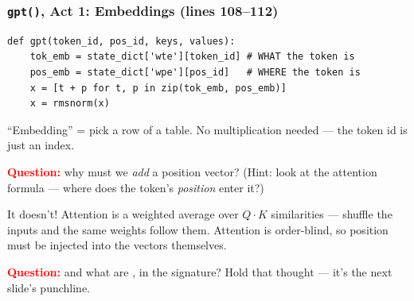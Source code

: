 \begin{frame}[fragile]
    \frametitle{\texttt{gpt()}, Act 1: Embeddings (lines 108--112)}

\begin{lstlisting}
def gpt(token_id, pos_id, keys, values):
    tok_emb = state_dict['wte'][token_id] # WHAT the token is
    pos_emb = state_dict['wpe'][pos_id]   # WHERE the token is
    x = [t + p for t, p in zip(tok_emb, pos_emb)]
    x = rmsnorm(x)
\end{lstlisting}

    ``Embedding'' = \alert{pick a row of a table}. No multiplication needed --- the token id is just an index.

    \pause

    \textcolor{red}{\textbf{Question:}} why must we \emph{add} a position vector? (Hint: look at the attention formula --- where does the token's \emph{position} enter it?)

    \pause

    It doesn't! Attention is a weighted average over $Q\!\cdot\!K$ similarities --- shuffle the inputs and the same weights follow them. Attention is \alert{order-blind}, so position must be injected \alert{into the vectors themselves}.

    \pause

    \textcolor{red}{\textbf{Question:}} and what are ,  in the signature? Hold that thought --- it's the next slide's punchline.
\end{frame}

